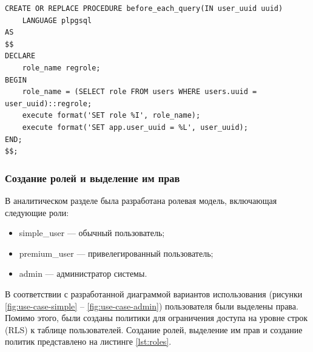 \begin{center}
	\captionsetup{justification=raggedright,singlelinecheck=off}
	\begin{lstlisting}[label=lst:func,caption=Реализация процедуры before\_each\_query]
CREATE OR REPLACE PROCEDURE before_each_query(IN user_uuid uuid)
	LANGUAGE plpgsql
AS
$$
DECLARE
	role_name regrole;
BEGIN
	role_name = (SELECT role FROM users WHERE users.uuid = user_uuid)::regrole;
	execute format('SET role %I', role_name);
	execute format('SET app.user_uuid = %L', user_uuid);
END;
$$;
	\end{lstlisting}
\end{center}

\subsubsection{Создание ролей и выделение им прав}

В аналитическом разделе была разработана ролевая модель, включающая следующие роли:
\begin{itemize}
	\item simple\_user --- обычный пользователь;
	\item premium\_user --- привелегированный пользователь;
	\item admin --- администратор системы.
\end{itemize}

В соответствии с разработанной диаграммой вариантов использования (рисунки \ref{fig:use-case-simple} -- \ref{fig:use-case-admin}) пользователя были выделены права. Помимо этого, были созданы политики для ограничения доступа на уровне строк (RLS) к таблице пользователей. Создание ролей, выделение им прав и создание политик представлено на листинге \ref{lst:roles}.

